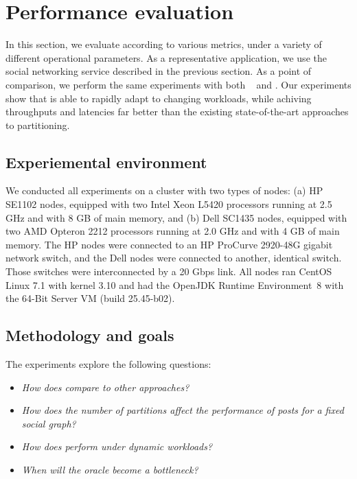 \section{Performance evaluation}
\label{sec:experiments}

In this section, we evaluate \dynastar{} according to various metrics,
under a variety of different operational parameters.  As a
representative application, we use the \appname{} social networking
service described in the previous section.  As a point of comparison,
we perform the same experiments with both
\ssmr{}~\cite{bezerra2014ssmr} and \dssmr. Our experiments show that
\dynastar{} is able to rapidly adapt to changing workloads, while
achiving throughputs and latencies far better than the existing
state-of-the-art approaches to partitioning.


\subsection{Experiemental environment}
\label{sec:evaluation:setup}

We conducted all experiments on a cluster with two types of nodes: (a)
HP SE1102 nodes, equipped with two Intel Xeon L5420 processors running
at 2.5 GHz and with 8 GB of main memory, and (b) Dell SC1435 nodes,
equipped with two AMD Opteron 2212 processors running at 2.0 GHz and
with 4 GB of main memory. The HP nodes were connected to an HP
ProCurve 2920-48G gigabit network switch, and the Dell nodes were
connected to another, identical switch. Those switches were
interconnected by a 20 Gbps link.  All nodes ran CentOS Linux 7.1 with
kernel 3.10 and had the OpenJDK Runtime Environment~8 with the
\mbox{64-Bit} Server VM (build 25.45-b02).


\subsection{Methodology and goals}
\label{sec:evaluation:methodology}

The experiments explore the following questions:
\begin{itemize}
\item \emph{How does \dynastar compare to other approaches?} 
\item \emph{How does the number of partitions affect the performance of posts for a fixed social graph?}
\item \emph{How does \dynastar perform under dynamic workloads?}
\item \emph{When will the oracle become a bottleneck?}
\end{itemize}




